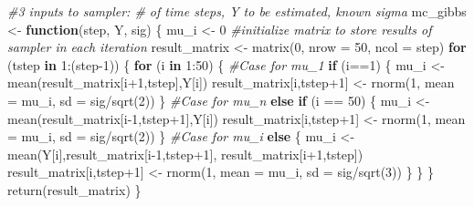 \documentclass[
]{article}
\newenvironment{Shaded}{\begin{snugshade}}{\end{snugshade}}
\newcommand{\AttributeTok}[1]{\textcolor[rgb]{0.77,0.63,0.00}{#1}}
\newcommand{\CommentTok}[1]{\textcolor[rgb]{0.56,0.35,0.01}{\textit{#1}}}
\newcommand{\ControlFlowTok}[1]{\textcolor[rgb]{0.13,0.29,0.53}{\textbf{#1}}}
\newcommand{\DecValTok}[1]{\textcolor[rgb]{0.00,0.00,0.81}{#1}}
\newcommand{\FunctionTok}[1]{\textcolor[rgb]{0.00,0.00,0.00}{#1}}
\newcommand{\NormalTok}[1]{#1}
\newcommand{\OtherTok}[1]{\textcolor[rgb]{0.56,0.35,0.01}{#1}}
\newcommand{\SpecialCharTok}[1]{\textcolor[rgb]{0.00,0.00,0.00}{#1}}
\begin{document}
\begin{Shaded}
\begin{Highlighting}[]
\CommentTok{\#3 inputs to sampler: \# of time steps, Y to be estimated, known sigma}
\NormalTok{mc\_gibbs }\OtherTok{\textless{}{-}} \ControlFlowTok{function}\NormalTok{(step, Y, sig) \{             }
\NormalTok{  mu\_i }\OtherTok{\textless{}{-}} \DecValTok{0}
  \CommentTok{\#initialize matrix to store results of sampler in each iteration}
\NormalTok{  result\_matrix }\OtherTok{\textless{}{-}} \FunctionTok{matrix}\NormalTok{(}\DecValTok{0}\NormalTok{, }\AttributeTok{nrow =} \DecValTok{50}\NormalTok{, }\AttributeTok{ncol =}\NormalTok{ step)     }
  \ControlFlowTok{for}\NormalTok{ (tstep }\ControlFlowTok{in} \DecValTok{1}\SpecialCharTok{:}\NormalTok{(step}\DecValTok{{-}1}\NormalTok{)) \{}
    \ControlFlowTok{for}\NormalTok{ (i }\ControlFlowTok{in} \DecValTok{1}\SpecialCharTok{:}\DecValTok{50}\NormalTok{) \{}
      \CommentTok{\#Case for mu\_1}
      \ControlFlowTok{if}\NormalTok{ (i}\SpecialCharTok{==}\DecValTok{1}\NormalTok{) \{                                  }
\NormalTok{        mu\_i }\OtherTok{\textless{}{-}} \FunctionTok{mean}\NormalTok{(result\_matrix[i}\SpecialCharTok{+}\DecValTok{1}\NormalTok{,tstep],Y[i])}
\NormalTok{        result\_matrix[i,tstep}\SpecialCharTok{+}\DecValTok{1}\NormalTok{] }\OtherTok{\textless{}{-}} \FunctionTok{rnorm}\NormalTok{(}\DecValTok{1}\NormalTok{, }\AttributeTok{mean =}\NormalTok{ mu\_i, }\AttributeTok{sd =}\NormalTok{ sig}\SpecialCharTok{/}\FunctionTok{sqrt}\NormalTok{(}\DecValTok{2}\NormalTok{))}
\NormalTok{      \}}
      \CommentTok{\#Case for mu\_n}
      \ControlFlowTok{else} \ControlFlowTok{if}\NormalTok{ (i }\SpecialCharTok{==} \DecValTok{50}\NormalTok{) \{                      }
\NormalTok{        mu\_i }\OtherTok{\textless{}{-}} \FunctionTok{mean}\NormalTok{(result\_matrix[i}\DecValTok{{-}1}\NormalTok{,tstep}\SpecialCharTok{+}\DecValTok{1}\NormalTok{],Y[i])}
\NormalTok{        result\_matrix[i,tstep}\SpecialCharTok{+}\DecValTok{1}\NormalTok{] }\OtherTok{\textless{}{-}} \FunctionTok{rnorm}\NormalTok{(}\DecValTok{1}\NormalTok{, }\AttributeTok{mean =}\NormalTok{ mu\_i, }\AttributeTok{sd =}\NormalTok{ sig}\SpecialCharTok{/}\FunctionTok{sqrt}\NormalTok{(}\DecValTok{2}\NormalTok{))}
\NormalTok{      \}}
      \CommentTok{\#Case for mu\_i}
      \ControlFlowTok{else}\NormalTok{ \{                                   }
\NormalTok{        mu\_i }\OtherTok{\textless{}{-}} \FunctionTok{mean}\NormalTok{(Y[i],result\_matrix[i}\DecValTok{{-}1}\NormalTok{,tstep}\SpecialCharTok{+}\DecValTok{1}\NormalTok{], result\_matrix[i}\SpecialCharTok{+}\DecValTok{1}\NormalTok{,tstep])}
\NormalTok{        result\_matrix[i,tstep}\SpecialCharTok{+}\DecValTok{1}\NormalTok{] }\OtherTok{\textless{}{-}} \FunctionTok{rnorm}\NormalTok{(}\DecValTok{1}\NormalTok{, }\AttributeTok{mean =}\NormalTok{ mu\_i, }\AttributeTok{sd =}\NormalTok{ sig}\SpecialCharTok{/}\FunctionTok{sqrt}\NormalTok{(}\DecValTok{3}\NormalTok{))}
\NormalTok{      \}}
\NormalTok{    \}}
\NormalTok{  \}}
  \FunctionTok{return}\NormalTok{(result\_matrix)}
\NormalTok{\}}
\end{Highlighting}
\end{Shaded}
\end{document}
